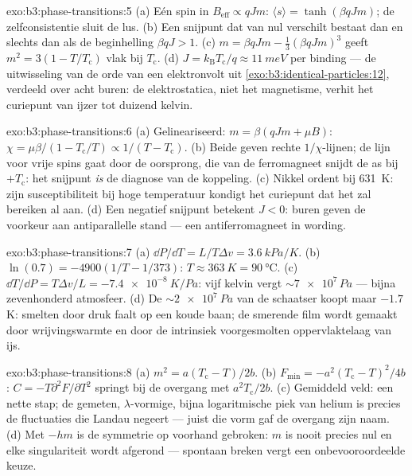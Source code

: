 \begin{solution}{exo:b3:phase-transitions:5}
(a) Eén spin in $B_{\text{eff}} \propto qJm$: $\langle s\rangle =
\tanh(\beta qJm)$; de zelfconsistentie sluit de lus. (b) Een snijpunt
dat van nul verschilt bestaat dan en slechts dan als de beginhelling $\beta qJ > 1$. (c) $m =
\beta qJm - \tfrac13(\beta qJm)^3$ geeft $m^2 = 3(1 -
T/T_{\text{c}})$ vlak bij $T_{\text{c}}$. (d) $J =
k_{\text{B}}T_{\text{c}}/q \approx \qty{11}{meV}$ per binding ---
de uitwisseling van de orde van een elektronvolt uit
\cref{exo:b3:identical-particles:12}, verdeeld over acht
buren: de elektrostatica, niet het magnetisme, verhit het curiepunt
van ijzer tot duizend kelvin.
\end{solution}

\begin{solution}{exo:b3:phase-transitions:6}
(a) Gelineariseerd: $m = \beta(qJm + \mu B)$: $\chi =
\mu\beta/(1 - T_{\text{c}}/T) \propto 1/(T - T_{\text{c}})$. (b)
Beide geven rechte $1/\chi$-lijnen; de lijn voor vrije spins gaat
door de oorsprong, die van de ferromagneet snijdt de as bij
$+T_{\text{c}}$: het snijpunt \emph{is} de diagnose van de
koppeling. (c) Nikkel ordent bij \qty{631}{K}: zijn susceptibiliteit
bij hoge temperatuur kondigt het curiepunt dat het zal bereiken al aan.
(d) Een negatief snijpunt betekent $J < 0$: buren geven de voorkeur aan
antiparallelle stand --- een antiferromagneet in wording.
\end{solution}

\begin{solution}{exo:b3:phase-transitions:7}
(a) $\dd P/\dd T = L/T\Delta v = \qty{3.6}{kPa/K}$. (b)
$\ln(0.7) = -4900(1/T - 1/373)$: $T \approx \qty{363}{K} =
\qty{90}{\celsius}$. (c) $\dd T/\dd P = T\Delta v/L =
\qty{-7.4e-8}{K/Pa}$: vijf kelvin vergt $\sim\num{7e7}\,\unit{Pa}$
--- bijna zevenhonderd atmosfeer. (d) De
$\sim\qty{2e7}{Pa}$ van de schaatser koopt maar $-1.7$ K: smelten door
druk faalt op een koude baan; de smerende film wordt gemaakt door
wrijvingswarmte en door de intrinsiek voorgesmolten oppervlaktelaag van ijs.
\end{solution}

\begin{solution}{exo:b3:phase-transitions:8}
(a) $m^2 = a(T_{\text{c}} - T)/2b$. (b) $F_{\min} =
-a^2(T_{\text{c}} - T)^2/4b$: $C = -T\partial^2F/\partial T^2$
springt bij de overgang met $a^2T_{\text{c}}/2b$. (c) Gemiddeld veld:
een nette stap; de gemeten, $\lambda$-vormige, bijna logaritmische
piek van helium is precies de fluctuaties die Landau negeert --- juist die vorm gaf
de overgang zijn naam. (d) Met $-hm$ is de symmetrie
op voorhand gebroken: $m$ is nooit precies nul en elke singulariteit wordt
afgerond --- spontaan breken vergt een onbevooroordeelde keuze.
\end{solution}


